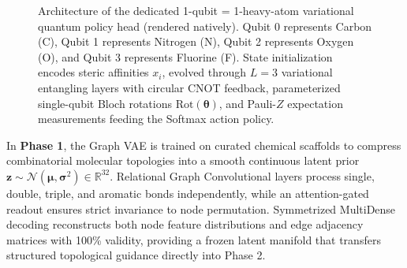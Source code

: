 \documentclass[10pt,a4paper]{article}
\begin{document}
\begin{figure}[!htbp]
\caption{Architecture of the dedicated 1-qubit = 1-heavy-atom variational quantum policy head (rendered natively). Qubit 0 represents Carbon (C), Qubit 1 represents Nitrogen (N), Qubit 2 represents Oxygen (O), and Qubit 3 represents Fluorine (F). State initialization encodes steric affinities $x_i$, evolved through $L=3$ variational entangling layers with circular CNOT feedback, parameterized single-qubit Bloch rotations $\mathrm{Rot}(\boldsymbol{\theta})$, and Pauli-$Z$ expectation measurements feeding the Softmax action policy.}
\label{fig:quantum_circuit}
\end{figure}

In \textbf{Phase 1}, the Graph VAE is trained on curated chemical scaffolds to compress combinatorial molecular topologies into a smooth continuous latent prior $\mathbf{z} \sim \mathcal{N}(\boldsymbol{\mu}, \boldsymbol{\sigma}^2) \in \mathbb{R}^{32}$. Relational Graph Convolutional layers process single, double, triple, and aromatic bonds independently, while an attention-gated readout ensures strict invariance to node permutation. Symmetrized MultiDense decoding reconstructs both node feature distributions and edge adjacency matrices with 100\% validity, providing a frozen latent manifold that transfers structured topological guidance directly into Phase 2.
\end{document}
